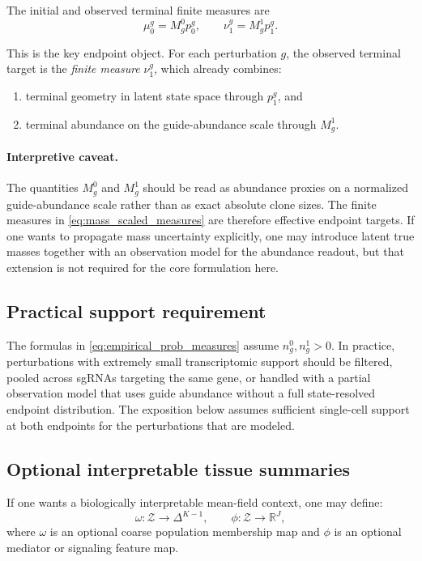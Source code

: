 \documentclass[11pt]{article}
\newcommand{\R}{\mathbb{R}}
\newcommand{\Zcal}{\mathcal{Z}}
\newcommand{\simplex}{\Delta}
\begin{document}
The initial and observed terminal finite measures are
\begin{equation}
\mu_0^g = M_g^0 p_0^g,
\qquad
\nu_1^g = M_g^1 p_1^g.
\label{eq:mass_scaled_measures}
\end{equation}

This is the key endpoint object. For each perturbation $g$, the observed terminal target is the \emph{finite measure} $\nu_1^g$, which already combines:
\begin{enumerate}[label=(\roman*),leftmargin=2.2em]
    \item terminal geometry in latent state space through $p_1^g$, and
    \item terminal abundance on the guide-abundance scale through $M_g^1$.
\end{enumerate}

\paragraph{Interpretive caveat.}
The quantities $M_g^0$ and $M_g^1$ should be read as abundance proxies on a normalized guide-abundance scale rather than as exact absolute clone sizes. The finite measures in \cref{eq:mass_scaled_measures} are therefore effective endpoint targets. If one wants to propagate mass uncertainty explicitly, one may introduce latent true masses together with an observation model for the abundance readout, but that extension is not required for the core formulation here.

\subsection{Practical support requirement}

The formulas in \cref{eq:empirical_prob_measures} assume $n_g^0,n_g^1>0$. In practice, perturbations with extremely small transcriptomic support should be filtered, pooled across sgRNAs targeting the same gene, or handled with a partial observation model that uses guide abundance without a full state-resolved endpoint distribution. The exposition below assumes sufficient single-cell support at both endpoints for the perturbations that are modeled.

\subsection{Optional interpretable tissue summaries}

If one wants a biologically interpretable mean-field context, one may define:
\[
\omega : \Zcal \to \simplex^{K-1},
\qquad
\phi : \Zcal \to \R^J,
\]
where $\omega$ is an optional coarse population membership map and $\phi$ is an optional mediator or signaling feature map.
\end{document}

